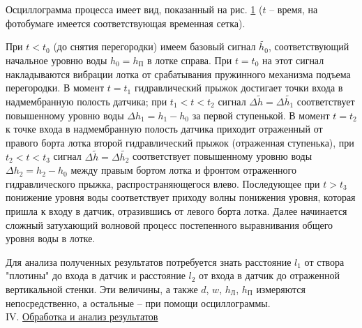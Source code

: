 \documentclass[specialist, subf, href, colorlinks=true, 14pt, final]{disser}
\theoremstyle{definition}
\begin{document}
Осциллограмма процесса имеет вид, показанный на рис. \ref{1-4-6} ($t$ -- время, на фотобумаге имеется соответствующая временная сетка).
\newpage
\begin{figure}[!htp]
  \caption{}
  \label{1-4-6}
\end{figure}

При $t < t_0$ (до снятия перегородки) имеем базовый сигнал $\widetilde{h_0}$, соответствующий начальное уровню воды $h_{0} = h_{\text{П}}$ в лотке справа. При $t = t_0$ на этот сигнал накладываются вибрации лотка от срабатывания пружинного механизма подъема перегородки. В момент $t = t_1$ гидравлический прыжок достигает точки входа в надмембранную полость датчика; при $t_{1} < t < t_{2}$ сигнал $\Delta \widetilde{h} = \Delta \widetilde{h_1}$ соответствует повышенному уровню воды $\Delta h_{1} = h_{1} - h_{0}$ за первой ступенькой. В момент $t = t_2$ к точке входа в надмембранную полость датчика приходит отраженный от правого борта лотка второй гидравлический прыжок (отраженная ступенька), при $t_{2} < t < t_{3}$ сигнал $\Delta \widetilde{h} = \Delta \widetilde{h_2}$ соответствует повышенному уровню воды $\Delta h_{2} = h_{2} - h_{0}$ между правым бортом лотка и фронтом отраженного гидравлического прыжка, распространяющегося влево. Последующее при $t > t_3$ понижение уровня воды соответствует приходу волны понижения уровня, которая пришла к входу в датчик, отразившись от левого борта лотка. Далее начинается сложный затухающий волновой процесс постепенного выравнивания общего уровня воды в лотке.

Для анализа полученных результатов потребуется знать расстояние $l_1$ от створа "плотины"{} до входа в датчик и расстояние $l_2$ от входа в датчик до отраженной вертикальной стенки. Эти величины, а также $d$, $w$, $h_{\text{Л}}$, $h_{\text{П}}$ измеряются непосредственно, а остальные -- при помощи осциллограммы.\\

\noindent IV. \underline{Обработка и анализ результатов}
\end{document}
